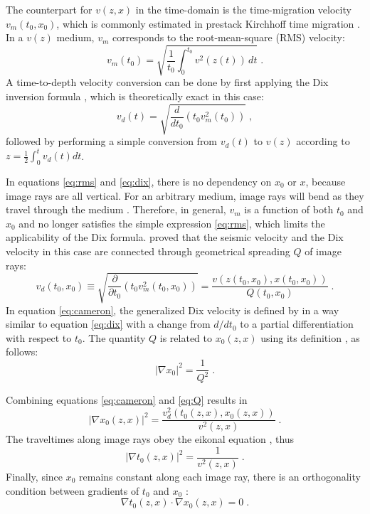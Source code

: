 The counterpart for $v (z,x)$ in the time-domain is the time-migration velocity $v_m (t_0,x_0)$, which is 
commonly estimated in prestack Kirchhoff time migration \cite[]{yilmaz,fomel1}. In a $v (z)$ medium, $v_m$ 
corresponds to the root-mean-square (RMS) velocity:
\begin{equation}
\label{eq:rms}
v_m (t_0) = \sqrt{\frac{1}{t_0} \int_0^{t_0} v^2 (z(t))\,dt}\;.
\end{equation}
A time-to-depth velocity conversion can be done by first applying the Dix inversion formula \cite[]{dix}, which 
is theoretically exact in this case:
\begin{equation}
\label{eq:dix}
v_d (t) = \sqrt{\frac{d}{d t_0} (t_0 v_m^2 (t_0))}\;,
\end{equation}
followed by performing a simple conversion from $v_d (t)$ to $v (z)$ according to 
$z = \frac{1}{2} \int_0^t v_d (t) dt$. 

In equations \ref{eq:rms} and \ref{eq:dix}, there is no dependency on $x_0$ or $x$, because image rays are 
all vertical. For an arbitrary medium, image rays will bend as they travel through the medium \cite[]{larner}. 
Therefore, in general, $v_m$ is a function of both $t_0$ and 
$x_0$ and no longer satisfies the simple expression \ref{eq:rms}, which limits the applicability of the Dix 
formula. \cite{cameron1} proved that the seismic velocity and the Dix velocity in this case are connected through 
geometrical spreading $Q$ of image rays:
\begin{equation}
\label{eq:cameron}
v_d (t_0,x_0) \equiv \sqrt{\frac{\partial}{\partial t_0} (t_0 v_m^2 (t_0,x_0))} 
= \frac{v(z(t_0,x_0),x(t_0,x_0))}{Q(t_0,x_0)}\;.
\end{equation}
In equation \ref{eq:cameron}, the generalized Dix velocity is defined by \cite{cameron1} in a way similar 
to equation \ref{eq:dix} with a change from $d / dt_0$ to a partial differentiation with respect to $t_0$. The 
quantity $Q$ is related to $x_0 (z,x)$ using its definition \cite[]{popov,cameron1}, as follows:
\begin{equation}
\label{eq:Q}
| \nabla x_0 |^2 = \frac{1}{Q^2}\;.
\end{equation}

Combining equations \ref{eq:cameron} and \ref{eq:Q} results in
\begin{equation}
\label{eq:x0}
| \nabla x_0 (z,x) |^2 = \frac{v_d^2 (t_0 (z,x),x_0 (z,x))}{v^2 (z,x)}\;.
\end{equation}
The traveltimes along image rays obey the eikonal equation \cite[]{hubral,chapman}, thus
\begin{equation}
\label{eq:t0}
| \nabla t_0 (z,x) |^2 = \frac{1}{v^2 (z,x)}\;.
\end{equation}
Finally, since $x_0$ remains constant along each image ray, there is an orthogonality condition between 
gradients of $t_0$ and $x_0$ \cite[]{cameron1}:
\begin{equation}
\label{eq:ortho}
\nabla t_0 (z,x) \cdot \nabla x_0 (z,x) = 0\;.
\end{equation}

